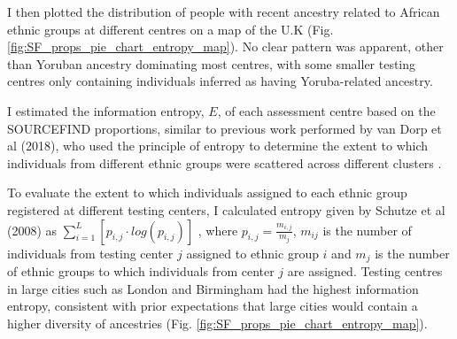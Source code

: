 I then plotted the distribution of people with recent ancestry related to African ethnic groups at different centres on a map of the U.K (Fig. \ref{fig:SF_props_pie_chart_entropy_map}). No clear pattern was apparent, other than Yoruban ancestry dominating most centres, with some smaller testing centres only containing individuals inferred as having Yoruba-related ancestry.  
 
I estimated the information entropy, $E$, of each assessment centre based on the SOURCEFIND proportions, similar to previous work performed by van Dorp et al (2018), who used the principle of entropy to determine the extent to which individuals from different ethnic groups were scattered across different clusters \cite{van2019genetic}.

To evaluate the extent to which individuals assigned to each ethnic group registered at different testing centers, I calculated entropy given by Schutze et al (2008) as $\sum_{i=1}^{L} [p_{i,j} \cdot log(p_{i,j})]$ \cite{schutze2008introduction}, where $p_{i,j} = \frac{m_{i,j}}{m_{j}}$, $m_{ij}$ is the number of individuals from testing center $j$ assigned to ethnic group $i$ and $m_{j}$ is the number of ethnic groups to which individuals from center $j$ are assigned. Testing centres in large cities such as London and Birmingham had the highest information entropy, consistent with prior expectations that large cities would contain a higher diversity of ancestries (Fig. \ref{fig:SF_props_pie_chart_entropy_map}). 


